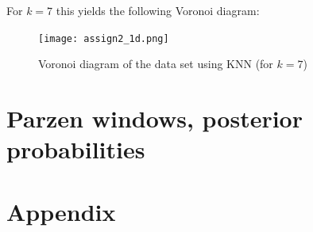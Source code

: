 \documentclass[10pt]{article}
\begin{document}
For $k=7$ this yields the following Voronoi diagram:
\begin{figure}[H]
 \centering
 \texttt{[image: assign2\_1d.png]}
 \caption{Voronoi diagram of the data set using KNN (for $k=7$)}
 \label{fi2.1d}
\end{figure}

\subsection{}

\section{Parzen windows, posterior probabilities}

\section*{Appendix}


\end{document}
